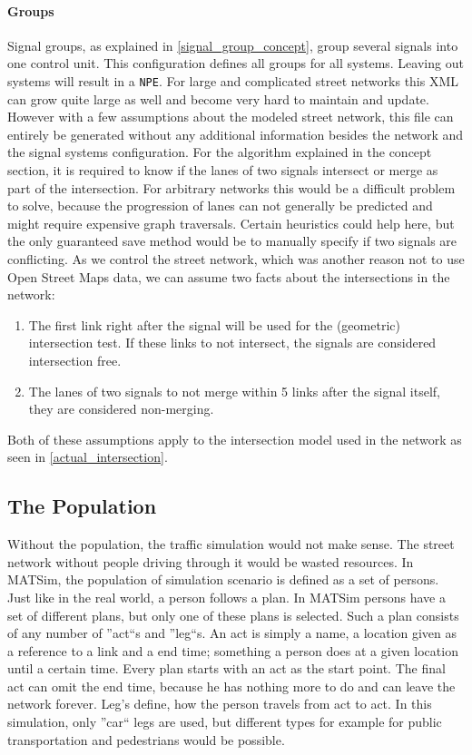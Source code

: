 \paragraph{Groups} Signal groups, as explained in \autoref{signal_group_concept}, group several signals into one control unit. This configuration defines all groups for all systems. Leaving out systems will result in a \texttt{NPE}. For large and complicated street networks this XML can grow quite large as well and become very hard to maintain and update. However with a few assumptions about the modeled street network, this file can entirely be generated without any additional information besides the network and the signal systems configuration. For the algorithm explained in the concept section, it is required to know if the lanes of two signals intersect or merge as part of the intersection. For arbitrary networks this would be a difficult problem to solve, because the progression of lanes can not generally be predicted and might require expensive graph traversals. Certain heuristics could help here, but the only guaranteed save method would be to manually specify if two signals are conflicting. As we control the street network, which was another reason not to use Open Street Maps data, we can assume two facts about the intersections in the network:

\begin{enumerate}
	\item The first link right after the signal will be used for the (geometric) intersection test. If these links to not intersect, the signals are considered intersection free.
	\item The lanes of two signals to not merge within 5 links after the signal itself, they are considered non-merging.
\end{enumerate}

Both of these assumptions apply to the intersection model used in the network as seen in \autoref{actual_intersection}.

\subsection*{The Population}

Without the population, the traffic simulation would not make sense. The street network without people driving through it would be wasted resources. In MATSim, the population of simulation scenario is defined as a set of persons. Just like in the real world, a person follows a plan. In MATSim persons have a set of different plans, but only one of these plans is selected. Such a plan consists of any number of ''act``s and ''leg``s. An act is simply a name, a location given as a reference to a link and a end time; something a person does at a given location until a certain time. Every plan starts with an act as the start point. The final act can omit the end time, because he has nothing more to do and can leave the network forever. Leg's define, how the person travels from act to act. In this simulation, only ''car`` legs are used, but different types for example for public transportation and pedestrians would be possible.

